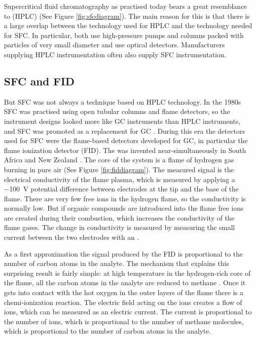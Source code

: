 Supercritical fluid chromatography as practised today bears a great resemblance
to  (HPLC) (See Figure
\ref{fig:sfcdiagram}). The main reason for this is that there is a large overlap
between the technology used for HPLC and the technology needed for SFC. In
particular, both use high-pressure pumps and columns packed with particles of
very small diameter and use optical detectors. Manufacturers supplying HPLC
instrumentation often also supply SFC instrumentation.

\subsection{SFC and FID}
\label{sec:FID}

But SFC was not always a technique based on HPLC technology. In the 1980s SFC
was practised using open tubular columns and flame detectors, so the instrument
designs looked more like GC instruments than HPLC instruments, and SFC was
promoted as a replacement for GC \autocite{Poole2003}. During this era the
detectors used for SFC were the flame-based detectors developed for GC, in
particular the flame ionization detector (FID). The  was invented near-simultaneously in South Africa and New Zealand
\autocite{Ettre2008}. The core of the system is a flame of hydrogen gas burning
in pure air (See Figure \ref{fig:fiddiagram}). The measured signal is the
electrical conductivity of the flame plasma, which is measured by applying a
\SI{-100}{\volt} potential difference between electrodes at the tip and the base
of the flame. There are very few free ions in the hydrogen flame, so the
conductivity is normally low. But if organic compounds are introduced into the
flame free ions are created during their combustion, which increases the
conductivity of the flame gases. The change in conductivity is measured by
measuring the small current between the two electrodes with an
.

As a first approximation the signal produced by the FID is proportional to the
number of carbon atoms in the analyte. The mechanism that explains this
surprising result is fairly simple: at high temperature in the hydrogen-rich
core of the flame, all the carbon atoms in the analyte are reduced to methane
\autocite{Holm1996}. Once it gets into contact with the hot oxygen in the outer
layers of the flame there is a chemi-ionization reaction. The electric field
acting on the ions creates a flow of ions, which can be measured as an electric
current. The current is proportional to the number of ions, which is
proportional to the number of methane molecules, which is proportional to the
number of carbon atoms in the analyte.

